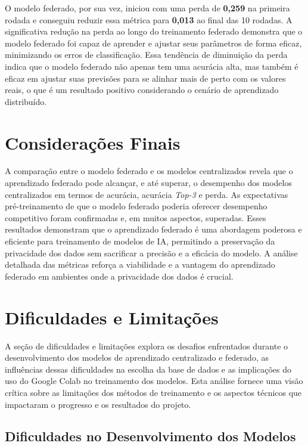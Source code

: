 O modelo federado, por sua vez, iniciou com uma perda de \textbf{0,259} na primeira rodada e conseguiu reduzir essa métrica para \textbf{0,013} ao final das 10 rodadas. A significativa redução na perda ao longo do treinamento federado demonstra que o modelo federado foi capaz de aprender e ajustar seus parâmetros de forma eficaz, minimizando os erros de classificação. Essa tendência de diminuição da perda indica que o modelo federado não apenas tem uma acurácia alta, mas também é eficaz em ajustar suas previsões para se alinhar mais de perto com os valores reais, o que é um resultado positivo considerando o cenário de aprendizado distribuído.

\section{Considerações Finais}

A comparação entre o modelo federado e os modelos centralizados revela que o aprendizado federado pode alcançar, e até superar, o desempenho dos modelos centralizados em termos de acurácia, acurácia \textit{Top-3} e perda. As expectativas pré-treinamento de que o modelo federado poderia oferecer desempenho competitivo foram confirmadas e, em muitos aspectos, superadas. Esses resultados demonstram que o aprendizado federado é uma abordagem poderosa e eficiente para treinamento de modelos de IA, permitindo a preservação da privacidade dos dados sem sacrificar a precisão e a eficácia do modelo. A análise detalhada das métricas reforça a viabilidade e a vantagem do aprendizado federado em ambientes onde a privacidade dos dados é crucial.

\section{Dificuldades e Limitações}

A seção de dificuldades e limitações explora os desafios enfrentados durante o desenvolvimento dos modelos de aprendizado centralizado e federado, as influências dessas dificuldades na escolha da base de dados e as implicações do uso do Google Colab no treinamento dos modelos. Esta análise fornece uma visão crítica sobre as limitações dos métodos de treinamento e os aspectos técnicos que impactaram o progresso e os resultados do projeto.

\subsection{Dificuldades no Desenvolvimento dos Modelos}

